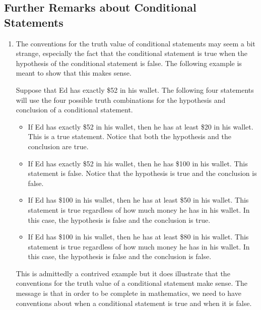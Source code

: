 \subsection*{Further Remarks about Conditional Statements}
\begin{enumerate}
\item The conventions for the truth value of conditional statements may seem a bit strange, especially the fact that the conditional statement is true when the hypothesis of the conditional statement is false.  The following example is meant to show that this makes sense.

Suppose that Ed has exactly \$52 in his wallet.  The following four statements will use the four possible truth combinations for the hypothesis and conclusion of a conditional statement.
\begin{itemize}
  \item If Ed has exactly \$52 in his wallet, then he has at least \$20 in his wallet.  This is a true statement.  Notice that both the hypothesis and the conclusion are true.
  \item If Ed has exactly \$52 in his wallet, then he has \$100 in his wallet.  This statement is false.  Notice that the hypothesis is true and the conclusion is false.
  \item If Ed has \$100 in his wallet, then he has at least  \$50 in his wallet.  This statement is true regardless of how much money he has in his wallet.  In this case, the hypothesis is false and the conclusion is true.
  \item If Ed has \$100 in his wallet, then he has at least  \$80 in his wallet.  This statement is true regardless of how much money he has in his wallet.  In this case, the hypothesis is false and the conclusion is false.
\end{itemize}
This is admittedly a contrived example but it does illustrate that the conventions for the truth value of a conditional statement make sense.  The message is that in order to be complete in mathematics, we need to have conventions about when a conditional statement is true and when it is false.  %


\end{enumerate}
